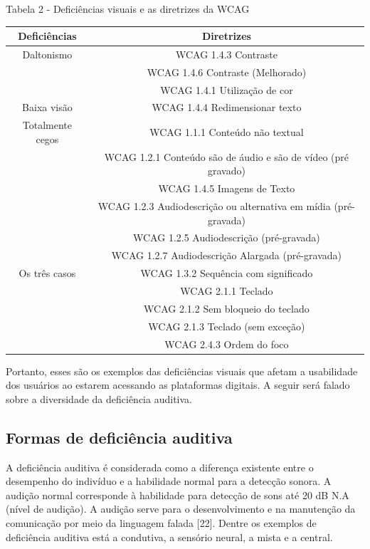 \documentclass[a4paper]{article}
\begin{document}
\begin{titlepage}
Tabela 2 - Deficiências visuais e as diretrizes da WCAG\\[-1cm]
\begin{center}
	\begin{longtable}{|c|c|}
		\hline
		Deficiências & Diretrizes\\
		\hline
		Daltonismo & WCAG 1.4.3 Contraste\\
		& WCAG 1.4.6 Contraste (Melhorado)\\
		& WCAG 1.4.1 Utilização de cor\\
		\hline
		Baixa visão & WCAG 1.4.4 Redimensionar texto\\
		\hline
		Totalmente cegos & WCAG 1.1.1 Conteúdo não textual\\
		& WCAG 1.2.1 Conteúdo são de áudio e são de vídeo (pré gravado)\\
		& WCAG 1.4.5 Imagens de Texto\\
		& WCAG 1.2.3 Audiodescrição ou alternativa em mídia (pré-gravada)\\
		& WCAG 1.2.5 Audiodescrição (pré-gravada)\\
		& WCAG 1.2.7 Audiodescrição Alargada (pré-gravada)\\
		\hline
		Os três casos & WCAG 1.3.2 Sequência com significado\\
		& WCAG 2.1.1 Teclado\\ 
		& WCAG 2.1.2 Sem bloqueio do teclado\\
		& WCAG 2.1.3 Teclado (sem exceção)\\
		& WCAG 2.4.3 Ordem do foco\\
		\hline
	\end{longtable}
\end{center}

Portanto, esses são os exemplos das deficiências visuais que afetam a usabilidade dos usuários ao estarem acessando as plataformas digitais. A seguir será falado sobre a diversidade da deficiência auditiva.

\subsection{Formas de deficiência auditiva}
A deficiência auditiva é considerada como a diferença existente entre o desempenho do indivíduo e a habilidade normal para a detecção sonora. A audição normal corresponde à habilidade para detecção de sons até 20 dB N.A (nível de audição). A audição serve para o desenvolvimento e na manutenção da comunicação por meio da linguagem falada [22]. Dentre os exemplos de deficiência auditiva está a condutiva, a sensório neural, a mista e a central.


\end{titlepage}
\end{document}
